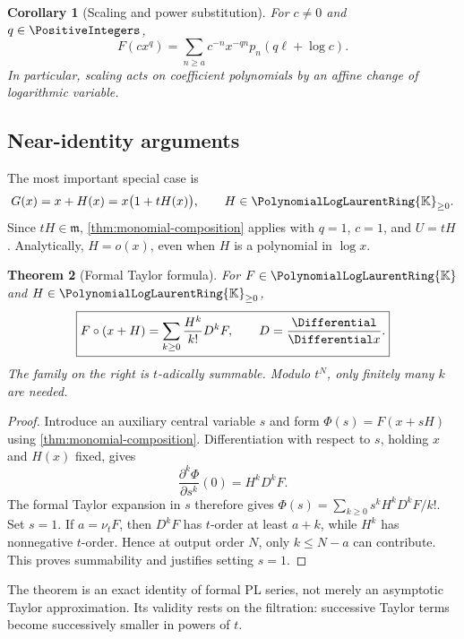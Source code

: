 \documentclass[11pt,oneside]{article}
\numberwithin{equation}{section}
\newtheorem{theorem}{Theorem}[section]
\newtheorem{corollary}[theorem]{Corollary}
\theoremstyle{definition}
\newcommand{\K}{\mathbb{K}}
\newcommand{\PL}{\PolynomialLogLaurentRing{\K}}
\newcommand{\ordx}{\nu_t}
\begin{document}
\begin{corollary}[Scaling and power substitution]
For \(c\ne0\) and \(q\in\PositiveIntegers\),
\begin{equation}\label{eq:scale-composition}
  F(cx^q)=\sum_{n\ge a}c^{-n}x^{-qn}
             p_n(q\ell+\log c).
\end{equation}
In particular, scaling acts on coefficient polynomials by an affine change of
logarithmic variable.
\end{corollary}

\subsection{Near-identity arguments}

The most important special case is
\begin{equation}\label{eq:near-identity-G}
  G(x)=x+H(x)=x\bigl(1+tH(x)\bigr),
  \qquad H\in\PL_{\ge0}.
\end{equation}
Since \(tH\in\mathfrak m\), \cref{thm:monomial-composition} applies with
\(q=1\), \(c=1\), and \(U=tH\).  Analytically, \(H=o(x)\), even when
\(H\) is a polynomial in \(\log x\).

\begin{theorem}[Formal Taylor formula]\label{thm:formal-taylor}
For \(F\in\PL\) and \(H\in\PL_{\ge0}\),
\begin{equation}\label{eq:formal-taylor}
\boxed{
  F\circ(x+H)=\sum_{k\ge0}\frac{H^k}{k!}D^kF,
  \qquad D=\frac{\Differential}{\Differential x}.
}
\end{equation}
The family on the right is \(t\)-adically summable.  Modulo \(t^N\), only
finitely many \(k\) are needed.
\end{theorem}

\begin{proof}
Introduce an auxiliary central variable \(s\) and form
\(\Phi(s)=F(x+sH)\) using \cref{thm:monomial-composition}.  Differentiation with
respect to \(s\), holding \(x\) and \(H(x)\) fixed, gives
\[
  \frac{\partial^k\Phi}{\partial s^k}(0)=H^kD^kF.
\]
The formal Taylor expansion in \(s\) therefore gives
\(\Phi(s)=\sum_{k\ge0}s^kH^kD^kF/k!\).  Set \(s=1\).  If
\(a=\ordx F\), then \(D^kF\) has \(t\)-order at least \(a+k\), while
\(H^k\) has nonnegative \(t\)-order.  Hence at output order \(N\), only
\(k\le N-a\) can contribute.  This proves summability and justifies setting
\(s=1\).
\end{proof}

The theorem is an exact identity of formal PL series, not merely an asymptotic
Taylor approximation.  Its validity rests on the filtration: successive Taylor
terms become successively smaller in powers of \(t\).
\end{document}
